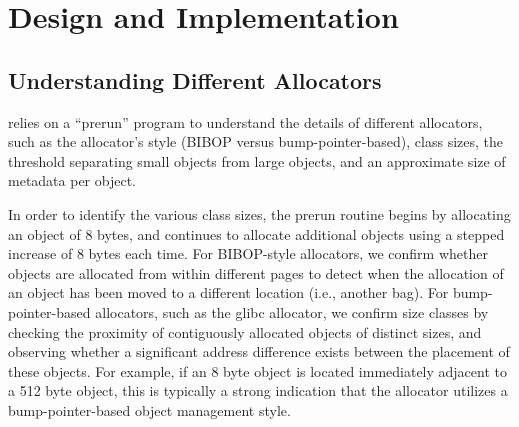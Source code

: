 \label{sec:implement}


\section{Design and Implementation}
\label{sec:implementation}

\subsection{Understanding Different Allocators}

\label{sec:understandingallocators}

\MP{} relies on a ``prerun'' program to understand the details of different allocators, such as the allocator's style (BIBOP versus bump-pointer-based), class sizes, the threshold separating small objects from large objects, and an approximate size of metadata per object. 

In order to identify the various class sizes, the prerun routine begins by allocating an object of 8 bytes, and continues to allocate  additional objects using a stepped increase of 8 bytes each time. For BIBOP-style allocators, we confirm whether objects are allocated from within different pages to detect when the allocation of an object has been moved to a different location (i.e., another bag). 
For bump-pointer-based allocators, such as the glibc allocator, we confirm size classes by checking the proximity of contiguously allocated objects of distinct sizes, and observing whether a significant address difference exists between the placement of these objects. For example, if an 8 byte object is located immediately adjacent to a 512 byte object, this is typically a strong indication that the allocator utilizes a bump-pointer-based object management style.

